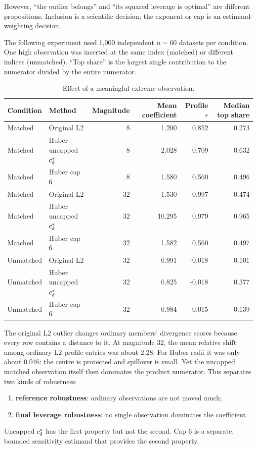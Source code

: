 However, ``the outlier belongs'' and ``its squared leverage is optimal'' are
different propositions. Inclusion is a scientific decision; the exponent or
cap is an estimand-weighting decision.

The following experiment used 1,000 independent $n=60$ datasets per condition.
One high observation was inserted at the same index (matched) or different
indices (unmatched). ``Top share'' is the largest single contribution to the
numerator divided by the entire numerator.

\begin{table}[ht]
\centering
\caption{Effect of a meaningful extreme observation.}
\small
\begin{tabular}{llrrrr}
\hline
Condition & Method & Magnitude & Mean coefficient & Profile $r$ & Median top share\\
\hline
Matched & Original L2 & 8 & 1.200 & 0.852 & 0.273\\
Matched & Huber uncapped $c_\delta^\ast$ & 8 & 2.028 & 0.709 & 0.632\\
Matched & Huber cap 6 & 8 & 1.580 & 0.560 & 0.496\\
Matched & Original L2 & 32 & 1.530 & 0.997 & 0.474\\
Matched & Huber uncapped $c_\delta^\ast$ & 32 & 10.295 & 0.979 & 0.965\\
Matched & Huber cap 6 & 32 & 1.582 & 0.560 & 0.497\\
\hline
Unmatched & Original L2 & 32 & 0.991 & -0.018 & 0.101\\
Unmatched & Huber uncapped $c_\delta^\ast$ & 32 & 0.825 & -0.018 & 0.377\\
Unmatched & Huber cap 6 & 32 & 0.984 & -0.015 & 0.139\\
\hline
\end{tabular}
\end{table}

The original L2 outlier changes ordinary members' divergence scores because
every row contains a distance to it. At magnitude 32, the mean relative shift
among ordinary L2 profile entries was about 2.28. For Huber radii it was only
about 0.046: the centre is protected and spillover is small. Yet the
uncapped matched observation itself then dominates the product numerator.
This separates two kinds of robustness:
\begin{enumerate}
\item \textbf{reference robustness}: ordinary observations are not moved much;
\item \textbf{final leverage robustness}: no single observation dominates the
coefficient.
\end{enumerate}
Uncapped $c_\delta^\ast$ has the first property but not the second. Cap 6 is a separate,
bounded sensitivity estimand that provides the second property.


